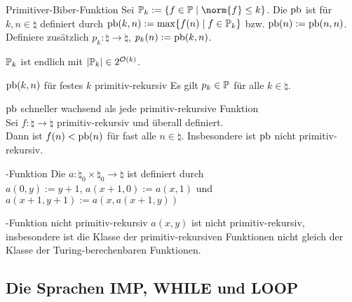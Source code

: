 \begin{Def}{Primitiver-Biber-Funktion}
    Sei $\pr_k := \{f \in \pr \;|\; \norm{f} \le k\}$.
    Die  $\text{pb}$ ist für $k, n \in \natural$ definiert durch
    $\text{pb}(k, n) := \max\{f(n) \;|\; f \in \mathbb{P}_k\}$ bzw.
    $\text{pb}(n) := \text{pb}(n, n)$.\\
    Definiere zusätzlich $p_k\colon \natural \rightarrow \natural$, $p_k(n) := \text{pb}(k, n)$.
\end{Def}

\begin{Bem}
    $\mathbb{P}_k$ ist endlich mit $|\mathbb{P}_k| \in 2^{\mathcal{O}(k)}$.
\end{Bem}

\begin{Satz}{$\text{pb}(k, n)$ für festes $k$ primitiv-rekursiv}
    Es gilt $p_k \in \mathbb{P}$ für alle $k \in \natural$.
\end{Satz}

\begin{Satz}{$\text{pb}$ schneller wachsend als jede primitiv-rekursive Funktion}\\
    Sei $f\colon \natural \rightarrow \natural$ primitiv-rekursiv und überall definiert.\\
    Dann ist $f(n) < \text{pb}(n)$ für fast alle $n \in \natural$.
    Insbesondere ist $\text{pb}$ nicht primitiv-rekursiv.
\end{Satz}

\linie

\begin{Def}{-Funktion}
    Die 
    $a\colon \natural_0 \times \natural_0 \rightarrow \natural$ ist definiert durch\\
    $a(0, y) := y + 1$, $a(x + 1, 0) := a(x, 1)$ und
    $a(x + 1, y + 1) := a(x, a(x + 1, y))$
\end{Def}

\begin{Satz}{-Funktion nicht primitiv-rekursiv}
    $a(x, y)$ ist nicht primitiv-rekursiv, insbesondere ist die Klasse der
    primitiv-rekursiven Funktionen nicht gleich der Klasse der Turing-berechenbaren Funktionen.
\end{Satz}

\pagebreak

\subsection{%
    Die Sprachen IMP, WHILE und LOOP%
}

